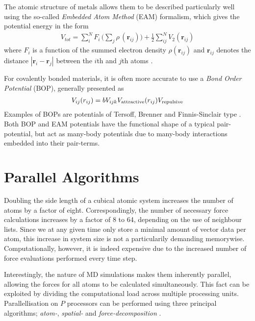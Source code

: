 The atomic structure of metals allows them to be described particularly well using the so-called \textit{Embedded Atom Method} (EAM) formalism, which gives the potential energy in the form
\begin{align}
V_{tot} = \sum_i^N F_i\, \bigg( \sum_j \rho\, (\mathbf{r}_{ij}) \bigg) + \frac{1}{2} \sum^N_{ij} V_2 (\mathbf{r}_{ij})
\end{align}
where  $F_i$ is a function of the summed electron density $\rho (\mathbf{r}_{ij})$ and $\mathbf{r}_{ij}$ denotes the distance $| \mathbf{r}_i - \mathbf{r}_j |$ between the $i$th and $j$th atoms \cite{EAMmodel,dudarevEAMpotential}. 

For covalently bonded materials, it is often more accurate to use a \textit{Bond Order Potential} (BOP), generally presented as
\begin{align}
V_{ij}(r_{ij}) =bV_{ijk}V_{\rm attractive}(r_{ij}) V_ {\rm repulsive}
\end{align}
Examples of BOPs are potentials of Tersoff, Brenner and Finnis-Sinclair type \cite{tersoff1988new, brenner1990empirical, finnis1984simple}. Both BOP and EAM potentials have the functional shape of a typical pair-potential, but act as many-body potentials due to many-body interactions embedded into their pair-terms.

\section{Parallel Algorithms}
Doubling the side length of a cubical atomic system increases the number of atoms by a factor of eight. 
Correspondingly, the number of necessary force calculations increases by a factor of  8 to 64, depending on the use of neighbour lists.
Since we at any given time only store a minimal amount of vector data per atom, this increase in system size is not a particularily demanding memorywise.
Computationally, however, it is indeed expensive due to the increased number of force evaluations performed every time step.

Interestingly, the nature of MD simulations makes them inherently parallel, allowing the forces for all atoms to be calculated simultaneously. 
This fact can be exploited by dividing the computational load across multiple processing units. 
Parallellisation on $P$ processors can be performed using three principal algorithms; \textit{atom-}, \textit{spatial-} and \textit{force-decomposition} 
\cite{fincham1987parallel}.

